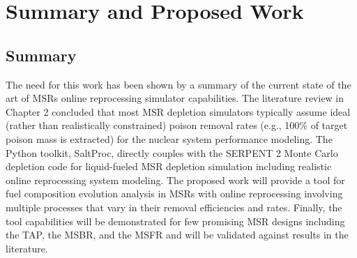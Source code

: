 \chapter[Summary and Proposed Work]{Summary and Proposed Work}

\section{Summary}
The need for this work has been shown by a summary of the 
current state of the art of \glspl{MSR} online reprocessing 
simulator capabilities. The literature review in Chapter 2 
concluded that most \gls{MSR} depletion simulators typically 
assume ideal (rather than realistically constrained) poison 
removal rates (e.g., 100\% of target poison mass is extracted) 
for the nuclear system performance modeling. The Python 
toolkit, SaltProc, directly couples with the SERPENT 2 Monte 
Carlo depletion 
code for liquid-fueled \gls{MSR} depletion simulation 
including realistic online reprocessing system modeling. 
The proposed work will provide a  
tool for fuel composition evolution analysis in \glspl{MSR} with 
online reprocessing involving multiple processes 
that vary in their removal efficiencies and rates. Finally, 
the tool capabilities will be demonstrated for few promising 
\gls{MSR} designs including the \gls{TAP}, 
the \gls{MSBR}, and the \gls{MSFR} and will be validated against 
results in the literature.

 
